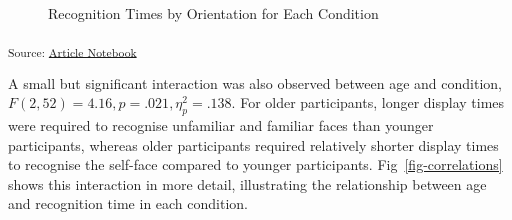 \documentclass[
  10pt,
  letterpaper,
]{article}
\begin{document}
\label{cell-fig-recognition-times}
\begin{figure}[H]


\caption{\label{fig-recognition-times}Recognition Times by Orientation
for Each Condition}

\end{figure}%

\textsubscript{Source:
\href{https://deborahapthorp.github.io/SelfFaceManuscript/index.qmd.html}{Article
Notebook}}

A small but significant interaction was also observed between age and
condition, \(F(2, 52) = 4.16, p = .021, \eta_p^2 = .138\). For older
participants, longer display times were required to recognise unfamiliar
and familiar faces than younger participants, whereas older participants
required relatively shorter display times to recognise the self-face
compared to younger participants. Fig~\ref{fig-correlations} shows this
interaction in more detail, illustrating the relationship between age
and recognition time in each condition.
\end{document}
